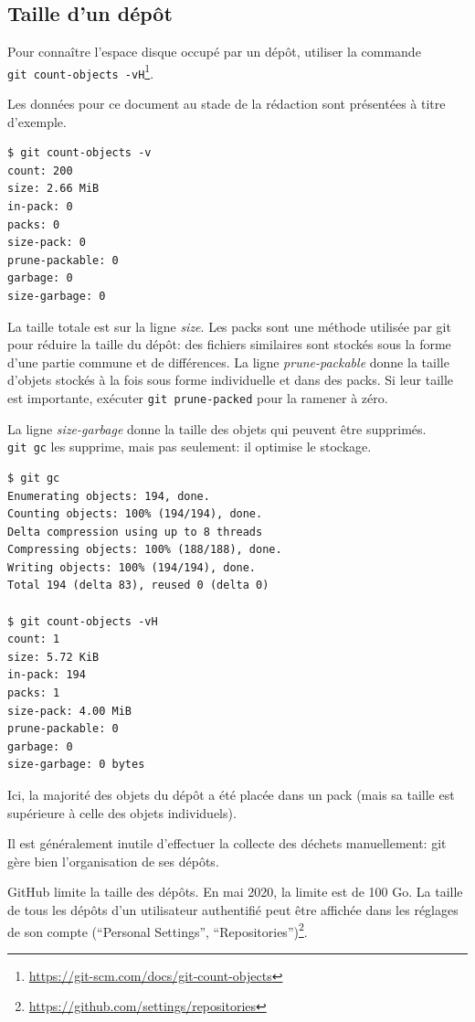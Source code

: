 \documentclass[
  12pt,
  french,
  a4paper,
  extrafontsizes,onecolumn,openright
  ]{memoir}
\begin{document}
\subsection{Taille d'un dépôt}\label{taille-dun-duxe9puxf4t}

Pour connaître l'espace disque occupé par un dépôt, utiliser la commande \texttt{git\ count-objects\ -vH}\footnote{\url{https://git-scm.com/docs/git-count-objects}}.

Les données pour ce document au stade de la rédaction sont présentées à titre d'exemple.

\begin{verbatim}
$ git count-objects -v
count: 200
size: 2.66 MiB
in-pack: 0
packs: 0
size-pack: 0
prune-packable: 0
garbage: 0
size-garbage: 0
\end{verbatim}

La taille totale est sur la ligne \emph{size}.
Les packs sont une méthode utilisée par git pour réduire la taille du dépôt: des fichiers similaires sont stockés sous la forme d'une partie commune et de différences.
La ligne \emph{prune-packable} donne la taille d'objets stockés à la fois sous forme individuelle et dans des packs.
Si leur taille est importante, exécuter \texttt{git\ prune-packed} pour la ramener à zéro.

La ligne \emph{size-garbage} donne la taille des objets qui peuvent être supprimés.
\texttt{git\ gc} les supprime, mais pas seulement: il optimise le stockage.

\begin{verbatim}
$ git gc
Enumerating objects: 194, done.
Counting objects: 100% (194/194), done.
Delta compression using up to 8 threads
Compressing objects: 100% (188/188), done.
Writing objects: 100% (194/194), done.
Total 194 (delta 83), reused 0 (delta 0)

$ git count-objects -vH
count: 1
size: 5.72 KiB
in-pack: 194
packs: 1
size-pack: 4.00 MiB
prune-packable: 0
garbage: 0
size-garbage: 0 bytes
\end{verbatim}

Ici, la majorité des objets du dépôt a été placée dans un pack (mais sa taille est supérieure à celle des objets individuels).

Il est généralement inutile d'effectuer la collecte des déchets manuellement: git gère bien l'organisation de ses dépôts.

GitHub limite la taille des dépôts.
En mai 2020, la limite est de 100 Go.
La taille de tous les dépôts d'un utilisateur authentifié peut être affichée dans les réglages de son compte (\enquote{Personal Settings}, \enquote{Repositories})\footnote{\url{https://github.com/settings/repositories}}.
\end{document}

